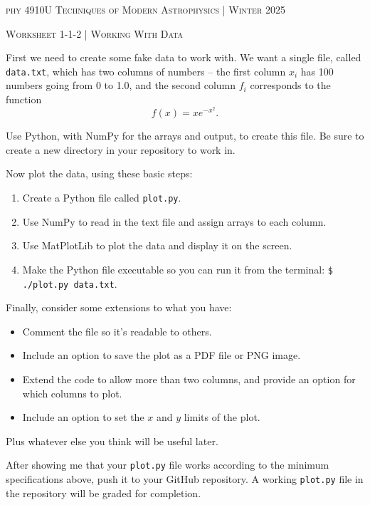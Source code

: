 \documentclass{article}
\begin{document}
\begin{center}
\textsc{\small phy 4910U Techniques of Modern Astrophysics | Winter 2025 }

\vspace{0.1in}  

\textsc{ {\Large Worksheet 1-1-2  |  Working With Data }}
\normalsize
\vspace{0.2in}
\end{center}




First we need to create some fake data to work with.  We want a single file, called \texttt{data.txt}, which has two columns of numbers -- the first column $x_i$ has 100 numbers going from 0 to 1.0, and the second column $f_i$ corresponds to the function
\[
f(x) = xe^{-x^2}.
\]

Use Python, with NumPy for the arrays and output, to create this file.  Be sure to create a new directory in your repository to work in.


Now plot the data, using these basic steps:

\begin{enumerate}
\item Create a Python file called \texttt{plot.py}.
\item Use NumPy to read in the text file and assign arrays to each column.
\item Use MatPlotLib to plot the data and display it on the screen.
\item Make the Python file executable so you can run it from the terminal: \texttt{\$ ./plot.py data.txt}.
\end{enumerate}

Finally, consider some extensions to what you have:
\begin{itemize}
\item Comment the file so it's readable to others.
\item Include an option to save the plot as a PDF file or PNG image.
\item Extend the code to allow more than two columns, and provide an option for which columns to plot.
\item Include an option to set the $x$ and $y$ limits of the plot.
\end{itemize}
Plus whatever else you think will be useful later.


After showing me that your \verb|plot.py| file works according to the minimum specifications above, push it to your GitHub repository.  A working \verb|plot.py| file in the repository will be graded for completion. 
\end{document}
